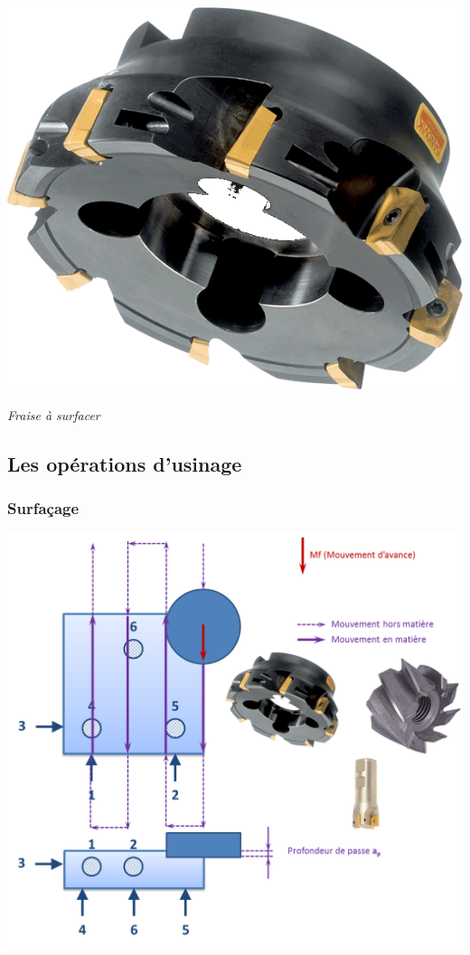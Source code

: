 \documentclass[11pt,oneside]{article}
\begin{document}
\begin{minipage}[c]{.3\linewidth}
\begin{center}
\includegraphics[width=.9\textwidth]{png/fr_surfacer}

\textit{Fraise à surfacer}
\end{center}
\end{minipage}



\subsection{Les opérations d'usinage}

\subsubsection{Surfaçage}
\begin{center}
\includegraphics[width=.6\textwidth]{png/op_surfacage}
\end{center}
\end{document}
